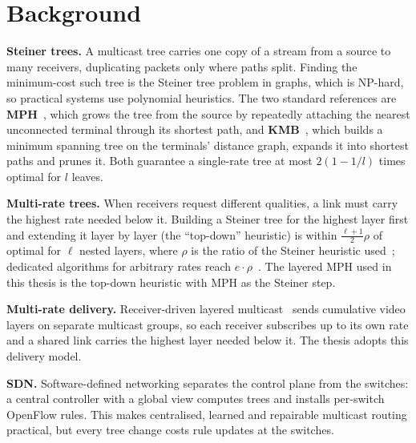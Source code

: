 \section{Background}\label{sec:lr_background}
\noindent \textbf{Steiner trees.} A multicast tree carries one copy of a stream from a source to many receivers, duplicating packets only where paths split. Finding the minimum-cost such tree is the Steiner tree problem in graphs, which is NP-hard, so practical systems use polynomial heuristics. The two standard references are \textbf{MPH}~\cite{takahashi1980mph}, which grows the tree from the source by repeatedly attaching the nearest unconnected terminal through its shortest path, and \textbf{KMB}~\cite{kou1981kmb}, which builds a minimum spanning tree on the terminals' distance graph, expands it into shortest paths and prunes it. Both guarantee a single-rate tree at most $2(1-1/l)$ times optimal for $l$ leaves.

\noindent \textbf{Multi-rate trees.} When receivers request different qualities, a link must carry the highest rate needed below it. Building a Steiner tree for the highest layer first and extending it layer by layer (the ``top-down'' heuristic) is within $\frac{\ell+1}{2}\rho$ of optimal for $\ell$ nested layers, where $\rho$ is the ratio of the Steiner heuristic used~\cite{ahmed2019mlst}; dedicated algorithms for arbitrary rates reach $e\cdot\rho$~\cite{charikar2004qos}. The layered MPH used in this thesis is the top-down heuristic with MPH as the Steiner step.

\noindent \textbf{Multi-rate delivery.} Receiver-driven layered multicast~\cite{mccanne1996rlm} sends cumulative video layers on separate multicast groups, so each receiver subscribes up to its own rate and a shared link carries the highest layer needed below it. The thesis adopts this delivery model.

\noindent \textbf{SDN.} Software-defined networking separates the control plane from the switches: a central controller with a global view computes trees and installs per-switch OpenFlow rules. This makes centralised, learned and repairable multicast routing practical, but every tree change costs rule updates at the switches.

